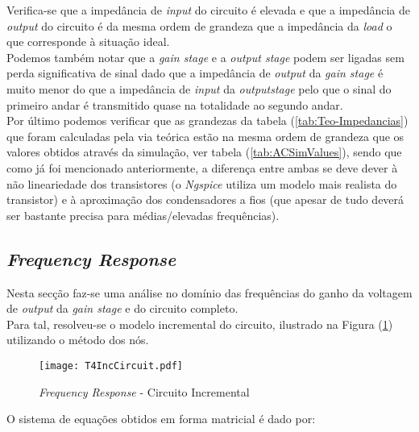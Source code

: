 Verifica-se que a impedância de \emph{input} do circuito é elevada e que a impedância de \emph{output} do circuito é da mesma ordem de grandeza
que a impedância da \emph{load} o que corresponde à situação ideal.
\\
Podemos também notar que a \emph{gain stage} e a \emph{output stage} podem ser ligadas sem perda significativa de sinal dado que a impedância
de \emph{output} da \emph{gain stage} é muito menor do que a impedância de \emph{input} da \emph{outputstage} pelo que o sinal 
do primeiro andar é transmitido quase na totalidade ao segundo andar.
\\
Por último podemos verificar que as grandezas da tabela (\ref{tab:Teo-Impedancias}) que foram calculadas pela via teórica
estão na mesma ordem de grandeza que os valores obtidos através da simulação, ver tabela (\ref{tab:ACSimValues}), sendo que como já foi
mencionado anteriormente, a diferença entre ambas se deve dever à não lineariedade dos transistores (o \emph{Ngspice} utiliza um modelo mais
realista do transistor) e à aproximação dos condensadores a fios (que apesar de tudo deverá ser bastante precisa para médias/elevadas frequências).

\subsection{\emph{Frequency Response}}

Nesta secção faz-se uma análise no domínio das frequências do ganho da voltagem de \emph{output} da \emph{gain stage} e do circuito completo.
\\
Para tal, resolveu-se o modelo incremental do circuito, ilustrado na Figura (\ref{fig:FrequencyResponseCircuitoIncremental}) utilizando o método dos nós.

\begin{figure}[H]
    \centering
    \texttt{[image: T4IncCircuit.pdf]}
    \caption{\emph{Frequency Response} - Circuito Incremental}
    \label{fig:FrequencyResponseCircuitoIncremental}
\end{figure}

O sistema de equações obtidos em forma matricial é dado por:

